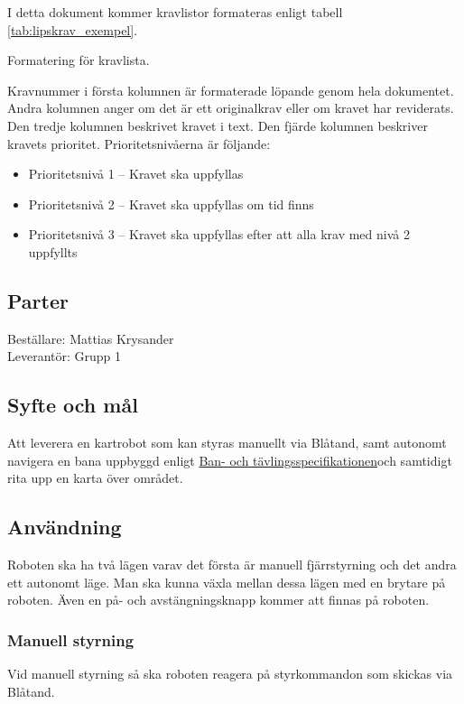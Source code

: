 \documentclass[a4paper,11pt]{article}
\newcommand{\LIPSprojektgrupp}{Grupp 1}
\newcommand{\CourseSpecUrl}{https://docs.google.com/document/d/1hnHsI6WGyKorMat25x1FAQ9RA_gEzG-Wgb9o5-Dw_AI/edit?usp=sharing}
\newcommand{\CourseSpecRef}{\href{\CourseSpecUrl}{Ban- och tävlingsspecifikationen}}
\begin{document}
I detta dokument kommer kravlistor formateras enligt tabell \ref{tab:lipskrav_exempel}.
\begin{table}[h!]
\begin{LIPSkravlista}
\end{LIPSkravlista}
\caption{Formatering för kravlista.}
\label{tab:lipskrav_exempel}
\end{table}

Kravnummer i första kolumnen är formaterade löpande genom hela dokumentet. Andra kolumnen anger om det är ett originalkrav eller om kravet har reviderats. Den tredje kolumnen beskrivet kravet i text. Den fjärde kolumnen beskriver kravets prioritet. Prioritetsnivåerna är följande:
\begin{itemize}
    \item Prioritetsnivå 1 – Kravet ska uppfyllas
    \item Prioritetsnivå 2 – Kravet ska uppfyllas om tid finns
    \item Prioritetsnivå 3 – Kravet ska uppfyllas efter att alla krav med nivå 2 uppfyllts 
\end{itemize}

\subsection{Parter}
Beställare: Mattias Krysander \\
Leverantör: \LIPSprojektgrupp \\

\subsection{Syfte och mål}
Att leverera en kartrobot som kan styras manuellt via Blåtand, samt autonomt navigera en bana uppbyggd enligt \CourseSpecRef och samtidigt rita upp en karta över området.  

\subsection{Användning}
Roboten ska ha två lägen varav det första är manuell fjärrstyrning och det andra ett autonomt läge. Man ska kunna växla mellan dessa lägen med en brytare på roboten. Även en på- och avstängningsknapp kommer att finnas på roboten.

\subsubsection{Manuell styrning}
Vid manuell styrning så ska roboten reagera på styrkommandon som skickas via Blåtand. 
\end{document}
